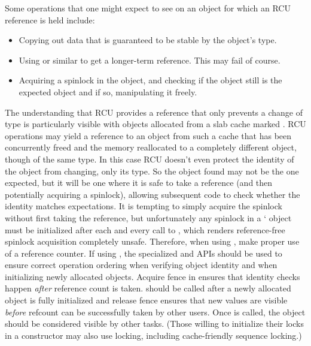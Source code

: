 Some operations that one might expect to see on an object for
which an RCU reference is held include:

\begin{itemize}
\item Copying out data that is guaranteed to be stable by the object's type.
\item Using  or similar to get a longer-term
      reference.
      This may fail of course.
\item Acquiring a spinlock in the object, and checking if the object still
      is the expected object and if so, manipulating it freely.
\end{itemize}

The understanding that RCU provides a reference that only prevents a
change of type is particularly visible with objects allocated from a
slab cache marked .
RCU operations may yield a
reference to an object from such a cache that has been concurrently freed
and the memory reallocated to a completely different object, though of
the same type.
In this case RCU doesn't even protect the identity of the
object from changing, only its type.
So the object found may not be the
one expected, but it will be one where it is safe to take a reference
(and then potentially acquiring a spinlock), allowing subsequent code
to check whether the identity matches expectations.
It is tempting
to simply acquire the spinlock without first taking the reference, but
unfortunately any spinlock in a ` object must be
initialized after each and every call to , which renders
reference-free spinlock acquisition completely unsafe.
Therefore, when
using , make proper use of a reference counter.
If using , the specialized 
and  APIs should be used to ensure correct operation
ordering when verifying object identity and when initializing newly
allocated objects.
Acquire fence in 
ensures that identity checks happen \emph{after} reference count is taken.
 should be called after a newly allocated object is
fully initialized and release fence ensures that new values are visible
\emph{before} refcount can be successfully taken by other users.
Once
 is called, the object should be considered visible
by other tasks.
(Those willing to initialize their locks in a  constructor
may also use locking, including cache-friendly sequence locking.)

